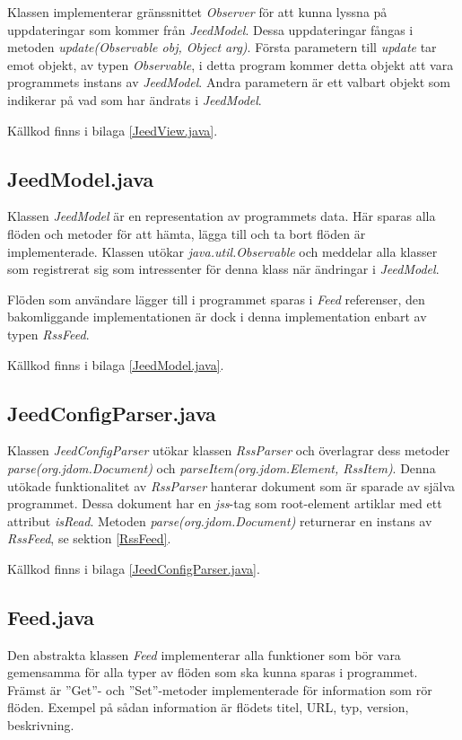 \documentclass[a4paper, 12pt]{article}
\begin{document}
Klassen implementerar gränssnittet \textit{Observer} för att kunna
lyssna på uppdateringar som kommer från \textit{JeedModel}. Dessa
uppdateringar fångas i metoden \textit{update(Observable obj, Object
  arg)}. Första parametern till \textit{update} tar emot objekt, av
typen \textit{Observable}, i detta program kommer detta objekt att
vara programmets instans av \textit{JeedModel}. Andra parametern är
ett valbart objekt som indikerar på vad som har ändrats i
\textit{JeedModel}. %

Källkod finns i bilaga \ref{JeedView.java}.

\subsection{JeedModel.java}\label{JeedModel}
Klassen \textit{JeedModel} är en representation av programmets
data. Här sparas alla flöden och metoder för att hämta, lägga till och
ta bort flöden är implementerade. Klassen utökar
\textit{java.util.Observable} och meddelar alla klasser som
registrerat sig som intressenter för denna klass när ändringar i
\textit{JeedModel}.

Flöden som användare lägger till i programmet sparas i \textit{Feed}
referenser, den bakomliggande implementationen är dock i denna
implementation enbart av typen \textit{RssFeed}.


Källkod finns i bilaga \ref{JeedModel.java}.

\subsection{JeedConfigParser.java}\label{JeedConfigParser}
Klassen \textit{JeedConfigParser} utökar klassen \textit{RssParser}
och överlagrar dess metoder \textit{parse(org.jdom.Document)} och
\textit{parseItem(org.jdom.Element, RssItem)}. Denna utökade
funktionalitet av \textit{RssParser} hanterar dokument som är sparade
av själva programmet. Dessa dokument har en \textit{jss}-tag som root-element
artiklar med ett attribut \textit{isRead}. Metoden
\textit{parse(org.jdom.Document)} returnerar en instans av
\textit{RssFeed}, se sektion \ref{RssFeed}.

Källkod finns i bilaga \ref{JeedConfigParser.java}.

\subsection{Feed.java}\label{Feed}
Den abstrakta klassen \textit{Feed} implementerar alla funktioner som
bör vara gemensamma för alla typer av flöden som ska kunna sparas i
programmet. Främst är ''Get''- och ''Set''-metoder implementerade för
information som rör flöden. Exempel på sådan information är flödets
titel, URL, typ, version, beskrivning.
\end{document}
